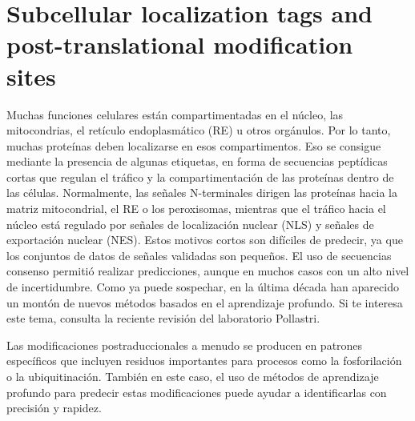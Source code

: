 \section{Subcellular localization tags and post-translational modification sites}
Muchas funciones celulares están compartimentadas en el núcleo, las mitocondrias, el retículo endoplasmático (RE) u otros orgánulos. Por lo tanto, muchas proteínas deben localizarse en esos compartimentos. Eso se consigue mediante la presencia de algunas etiquetas, en forma de secuencias peptídicas cortas que regulan el tráfico y la compartimentación de las proteínas dentro de las células. Normalmente, las señales N-terminales dirigen las proteínas hacia la matriz mitocondrial, el RE o los peroxisomas, mientras que el tráfico hacia el núcleo está regulado por señales de localización nuclear (NLS) y señales de exportación nuclear (NES). Estos motivos cortos son difíciles de predecir, ya que los conjuntos de datos de señales validadas son pequeños. El uso de secuencias consenso permitió realizar predicciones, aunque en muchos casos con un alto nivel de incertidumbre. Como ya puede sospechar, en la última década han aparecido un montón de nuevos métodos basados en el aprendizaje profundo. Si te interesa este tema, consulta la reciente revisión del laboratorio Pollastri.

Las modificaciones postraduccionales a menudo se producen en patrones específicos que incluyen residuos importantes para procesos como la fosforilación o la ubiquitinación. También en este caso, el uso de métodos de aprendizaje profundo para predecir estas modificaciones puede ayudar a identificarlas con precisión y rapidez.

